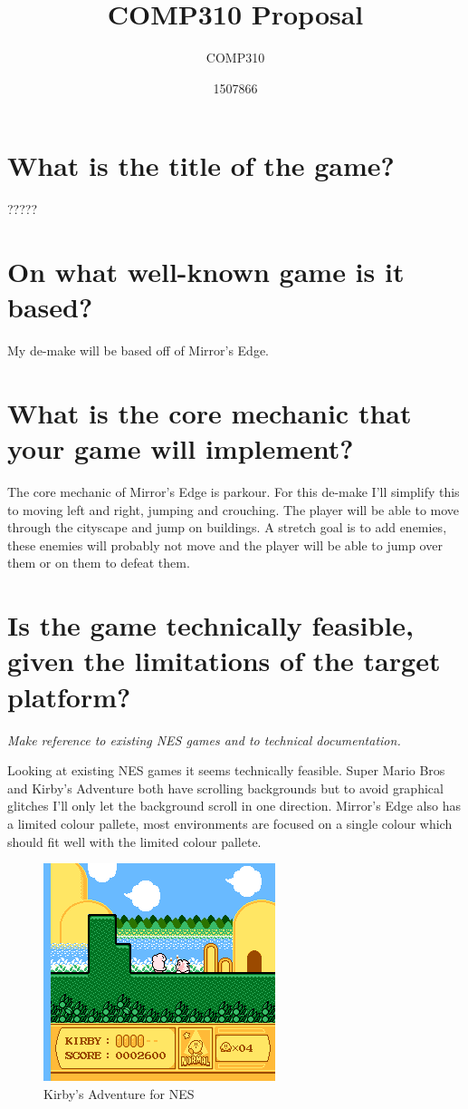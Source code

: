 \documentclass{scrartcl}
\title{COMP310 Proposal}
\subtitle{COMP310}
\author{1507866}
\begin{document}
	
\maketitle
\section{What is the title of the game?}
?????
\section{On what well-known game is it based?}
My de-make will be based off of Mirror's Edge. 

\section{What is the core mechanic that your game will implement?}
The core mechanic of Mirror's Edge is parkour. For this de-make I'll simplify this to moving left and right, jumping and crouching. The player will be able to move through the cityscape and jump on buildings. 
A stretch goal is to add enemies, these enemies will probably not move and the player will be able to jump over them or on them to defeat them. 

\section{Is the game technically feasible, given the limitations of the target platform?} \textit{Make reference to existing NES games and to technical documentation.}

Looking at existing NES games it seems technically feasible. Super Mario Bros and Kirby's Adventure both have scrolling backgrounds but to avoid graphical glitches I'll only let the background scroll in one direction.
Mirror's Edge also has a limited colour pallete, most environments are focused on a single colour which should fit well with the limited colour pallete.

\begin{figure}[H]
	\centering
	\includegraphics[width=0.5\linewidth]{Kirby.PNG}
	\caption{Kirby's Adventure for NES }
\end{figure}
	
\end{document}

